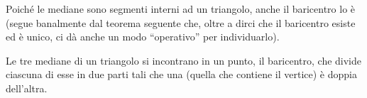 Poiché le mediane sono segmenti interni ad un triangolo, anche il 
baricentro lo è (segue banalmente dal teorema seguente che, oltre a 
dirci che il baricentro esiste ed è unico, ci dà anche un modo 
``operativo'' per individuarlo).

\begin{teorema}
Le tre mediane di un triangolo si incontrano in un punto, il 
baricentro, che divide ciascuna di esse in due parti tali che una 
(quella che contiene il vertice) è doppia dell'altra.
\end{teorema}


\begin{inaccessibleblock}
 \begin{figure}[htb]
	\centering
\end{figure}
\end{inaccessibleblock}

